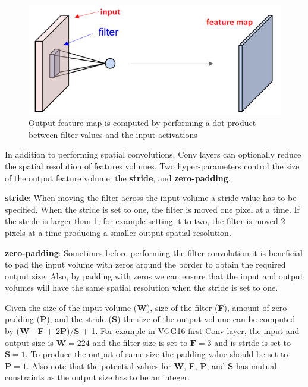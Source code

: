 \documentclass[10, sigconf]{acmart}
\begin{document}
\begin{figure}
  \includegraphics[width=\columnwidth]{./images/cnn_local_computation}
  \caption{Output feature map is computed by performing a dot product between filter values and the input activations}
  \label{fig:conv_local_comp}
\end{figure}

In addition to performing spatial convolutions, Conv layers can optionally reduce the spatial resolution of features volumes. Two hyper-parameters control the size of the output feature volume: the \textbf{stride}, and \textbf{zero-padding}.

\textbf{stride}: When moving the filter across the input volume a stride value has to be specified. When the stride is set to one, the filter is moved one pixel at a time. If the stride is larger than 1, for example setting it to two, the filter is moved 2 pixels at a time producing a smaller output spatial resolution.

\textbf{zero-padding}: Sometimes before performing the filter convolution it is beneficial to pad the input volume with zeros around the border to obtain the required output size. Also, by padding with zeros we can ensure that the input and output volumes will have the same spatial resolution when the stride is set to one.

Given the size of the input volume (\textbf{W}), size of the filter (\textbf{F}), amount of zero-padding (\textbf{P}), and the stride (\textbf{S}) the size of the output volume can be computed by (\textbf{W} - \textbf{F} + 2\textbf{P})/\textbf{S} + 1. For example in VGG16 first Conv layer, the input and output size is $\textbf{W}=224$ and the filter size is set to $\textbf{F}=3$ and is stride is set to $\textbf{S}=1$. To produce the output of same size the padding value should be set to $\textbf{P}=1$. Also note that the potential values for \textbf{W}, \textbf{F}, \textbf{P}, and \textbf{S} has mutual constraints as the output size has to be an integer.
\end{document}
